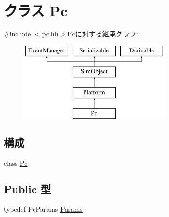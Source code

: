 \hypertarget{classPc}{
\section{クラス Pc}
\label{classPc}
}


{\ttfamily \#include $<$pc.hh$>$}Pcに対する継承グラフ:\begin{figure}[H]
\begin{center}
\leavevmode
\includegraphics[height=4cm]{classPc}
\end{center}
\end{figure}
\subsection*{構成}
\begin{DoxyCompactItemize}
\item 
class \hyperlink{classPc_1_1Pc}{Pc}
\end{DoxyCompactItemize}
\subsection*{Public 型}
\begin{DoxyCompactItemize}
\item 
typedef PcParams \hyperlink{classPc_a3cb59bd5a1945e535ba84d5e34ad19ec}{Params}
\end{DoxyCompactItemize}
